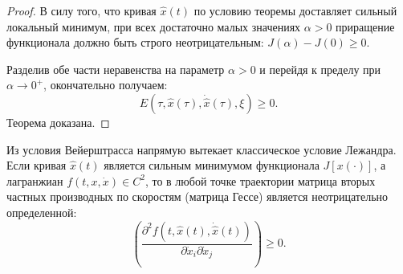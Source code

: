 \begin{proof}
В силу того, что кривая $\hat{x}(t)$ по условию теоремы доставляет сильный локальный минимум, при всех достаточно малых значениях $\alpha > 0$
приращение функционала должно быть строго неотрицательным: $J(\alpha) - J(0) \ge 0$. 

Разделив обе части неравенства на параметр $\alpha > 0$ и перейдя к пределу при $\alpha \to 0^+$, окончательно получаем:
\begin{equation}
    E(\tau, \hat{x}(\tau), \dot{\hat{x}}(\tau), \xi) \ge 0.
\end{equation}
Теорема доказана.
\end{proof}

\begin{corollary}
Из условия Вейерштрасса напрямую вытекает классическое условие Лежандра. 
Если кривая $\hat{x}(t)$ является сильным минимумом функционала $J[x(\cdot)]$, а лагранжиан $f(t, x, \dot{x}) \in C^2$,
то в любой точке траектории матрица вторых частных производных по скоростям (матрица Гессе) является неотрицательно определенной:
\begin{equation}
    \left( \frac{\partial^2 f(t, \hat{x}(t), \dot{\hat{x}}(t))}{\partial \dot{x}_i \partial \dot{x}_j} \right) \ge 0.
\end{equation}
\end{corollary}

